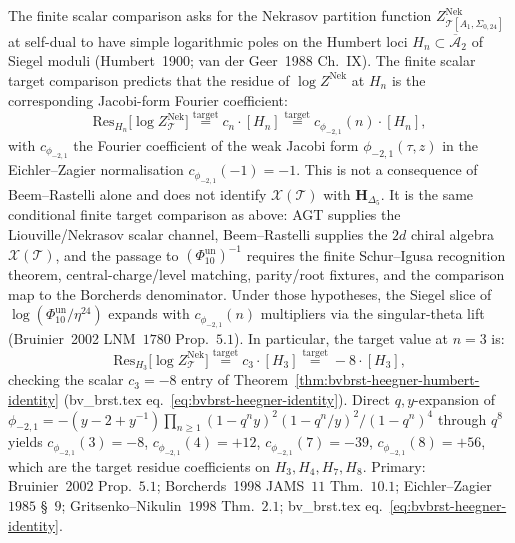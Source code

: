 \begin{remark}
\label{rem:feyn-nekrasov-humbert-residues}
The finite scalar comparison asks for the Nekrasov partition function
$Z^{\mathrm{Nek}}_{\mathcal T[A_1, \Sigma_{0,24}]}$ at
self-dual to have simple logarithmic poles on the Humbert loci
$H_n\subset \overline{\mathcal A}_2$ of Siegel moduli
(Humbert~1900; van der Geer~1988 Ch.~IX). The finite scalar target
comparison predicts that the residue of $\log Z^{\mathrm{Nek}}$ at
$H_n$ is the corresponding Jacobi-form Fourier coefficient:
\[
 \mathrm{Res}_{H_n}\bigl[\log Z^{\mathrm{Nek}}_{\mathcal T}\bigr]
 \stackrel{\mathrm{target}}{=} c_n\cdot [H_n]
 \stackrel{\mathrm{target}}{=} c_{\phi_{-2,1}}(n)\cdot [H_n],
\]
with $c_{\phi_{-2,1}}$ the Fourier coefficient of the weak
Jacobi form $\phi_{-2,1}(\tau, z)$ in the Eichler--Zagier
normalisation $c_{\phi_{-2,1}}(-1) = -1$. This is not a consequence of
Beem--Rastelli alone and does not identify
\(\mathcal X(\mathcal T)\) with \(\mathbf H_{\Delta_5}\). It is the same
conditional finite target comparison as above: AGT supplies the
Liouville/Nekrasov scalar channel, Beem--Rastelli supplies the \(2d\)
chiral algebra \(\mathcal X(\mathcal T)\), and the passage to
\((\Phi_{10}^{\mathrm{un}})^{-1}\) requires the finite Schur--Igusa
recognition theorem, central-charge/level matching, parity/root fixtures,
and the comparison map to the Borcherds denominator. Under those
hypotheses, the Siegel slice of
\(\log(\Phi_{10}^{\mathrm{un}}/\eta^{24})\) expands with
\(c_{\phi_{-2,1}}(n)\) multipliers via the singular-theta lift
(Bruinier~2002 LNM~$1780$ Prop.~$5.1$). In particular, the target value at
$n = 3$ is:
\[
 \mathrm{Res}_{H_3}\bigl[\log Z^{\mathrm{Nek}}_{\mathcal T}\bigr]
 \stackrel{\mathrm{target}}{=} c_3\cdot [H_3]
 \stackrel{\mathrm{target}}{=} -8\cdot [H_3],
\]
checking the scalar $c_3 = -8$ entry of
Theorem~\ref{thm:bvbrst-heegner-humbert-identity}
(bv\_brst.tex eq.~\eqref{eq:bvbrst-heegner-identity}).
Direct $q, y$-expansion of
$\phi_{-2,1} = -(y-2+y^{-1})\prod_{n\geq 1}
(1-q^n y)^2 (1-q^n/y)^2/(1-q^n)^4$ through $q^8$ yields
$c_{\phi_{-2,1}}(3) = -8$, $c_{\phi_{-2,1}}(4) = +12$,
$c_{\phi_{-2,1}}(7) = -39$, $c_{\phi_{-2,1}}(8) = +56$,
which are the target residue coefficients on $H_3, H_4, H_7, H_8$.
Primary: Bruinier~2002 Prop.~$5.1$; Borcherds~1998 JAMS~$11$
Thm.~$10.1$; Eichler--Zagier~$1985$ \S~$9$;
Gritsenko--Nikulin~$1998$ Thm.~$2.1$; bv\_brst.tex
eq.~\eqref{eq:bvbrst-heegner-identity}.
\end{remark}

